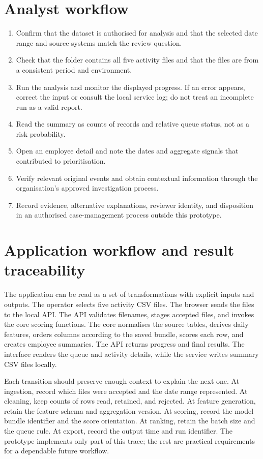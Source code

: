 \section{Analyst workflow}
\begin{enumerate}
  \item Confirm that the dataset is authorised for analysis and that
  the selected date range and source systems match the review
  question.
  \item Check that the folder contains all five activity files and
  that the files are from a consistent period and environment.
  \item Run the analysis and monitor the displayed progress. If an
  error appears, correct the input or consult the local service log;
  do not treat an incomplete run as a valid report.
  \item Read the summary as counts of records and relative queue
  status, not as a risk probability.
  \item Open an employee detail and note the dates and aggregate
  signals that contributed to prioritisation.
  \item Verify relevant original events and obtain contextual
  information through the organisation's approved investigation
  process.
  \item Record evidence, alternative explanations, reviewer identity,
  and disposition in an authorised case-management process outside
  this prototype.
\end{enumerate}

\section{Application workflow and result traceability}
The application can be read as a set of transformations with explicit
inputs and outputs. The operator selects five activity CSV files. The
browser sends the files to the local API. The API validates filenames,
stages accepted files, and invokes the core scoring functions. The core
normalises the source tables, derives daily features, orders columns
according to the saved bundle, scores each row, and creates employee
summaries. The API returns progress and final results. The interface
renders the queue and activity details, while the service writes
summary CSV files locally.

Each transition should preserve enough context to explain the next
one. At ingestion, record which files were accepted and the date range
represented. At cleaning, keep counts of rows read, retained, and
rejected. At feature generation, retain the feature schema and
aggregation version. At scoring, record the model bundle identifier
and the score orientation. At ranking, retain the batch size and the
queue rule. At export, record the output time and run identifier. The
prototype implements only part of this trace; the rest are practical
requirements for a dependable future workflow.

